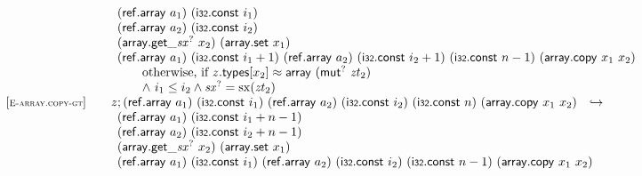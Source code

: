 $$\begin{array}[t]{@{}lrcl@{}l@{}}
& \multicolumn{4}{@{}l@{}}{\quad
\begin{array}[t]{@{}l@{}l@{}l@{}}
\begin{array}[t]{@{}l@{}} (\mathsf{ref{.}array}~a_1)~(\mathsf{i{\scriptstyle 32}}{.}\mathsf{const}~i_1) \\
  (\mathsf{ref{.}array}~a_2)~(\mathsf{i{\scriptstyle 32}}{.}\mathsf{const}~i_2) \\
  ({\mathsf{array{.}get}}{\mathsf{\_}}{{{\mathit{sx}}^?}}~x_2)~(\mathsf{array{.}set}~x_1) \\
  (\mathsf{ref{.}array}~a_1)~(\mathsf{i{\scriptstyle 32}}{.}\mathsf{const}~i_1 + 1)~(\mathsf{ref{.}array}~a_2)~(\mathsf{i{\scriptstyle 32}}{.}\mathsf{const}~i_2 + 1)~(\mathsf{i{\scriptstyle 32}}{.}\mathsf{const}~n - 1)~(\mathsf{array{.}copy}~x_1~x_2) \end{array} & & \\
 \multicolumn{3}{@{}l@{}}{\quad
\begin{array}[t]{@{}l@{}}
\quad
\begin{array}[t]{@{}l@{}}
\mbox{otherwise, if}~ z{.}\mathsf{types}{}[x_2] \approx \mathsf{array}~({\mathsf{mut}^?}~{\mathit{zt}}_2) \\
{\land}~ i_1 \leq i_2 \land {{\mathit{sx}}^?} = {\mathrm{sx}}({\mathit{zt}}_2) \\
\end{array} \\
\end{array}
} \\
\end{array}
} \\
{[\textsc{\scriptsize E{-}array.copy{-}gt}]} \quad & z ; (\mathsf{ref{.}array}~a_1)~(\mathsf{i{\scriptstyle 32}}{.}\mathsf{const}~i_1)~(\mathsf{ref{.}array}~a_2)~(\mathsf{i{\scriptstyle 32}}{.}\mathsf{const}~i_2)~(\mathsf{i{\scriptstyle 32}}{.}\mathsf{const}~n)~(\mathsf{array{.}copy}~x_1~x_2) & \hookrightarrow & & \\
& \multicolumn{4}{@{}l@{}}{\quad
\begin{array}[t]{@{}l@{}l@{}l@{}}
\begin{array}[t]{@{}l@{}} (\mathsf{ref{.}array}~a_1)~(\mathsf{i{\scriptstyle 32}}{.}\mathsf{const}~i_1 + n - 1) \\
  (\mathsf{ref{.}array}~a_2)~(\mathsf{i{\scriptstyle 32}}{.}\mathsf{const}~i_2 + n - 1) \\
  ({\mathsf{array{.}get}}{\mathsf{\_}}{{{\mathit{sx}}^?}}~x_2)~(\mathsf{array{.}set}~x_1) \\
  (\mathsf{ref{.}array}~a_1)~(\mathsf{i{\scriptstyle 32}}{.}\mathsf{const}~i_1)~(\mathsf{ref{.}array}~a_2)~(\mathsf{i{\scriptstyle 32}}{.}\mathsf{const}~i_2)~(\mathsf{i{\scriptstyle 32}}{.}\mathsf{const}~n - 1)~(\mathsf{array{.}copy}~x_1~x_2) \end{array} & & \\

\end{array}}
\end{array}$$
